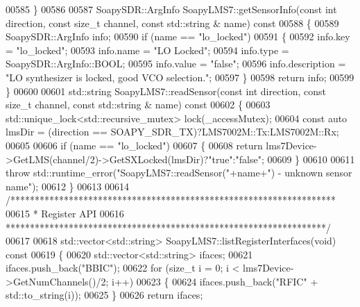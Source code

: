 \begin{DoxyCode}
{{{{{{{{{{{{{{00585 \}
00586 
00587 SoapySDR::ArgInfo SoapyLMS7::getSensorInfo(\textcolor{keyword}{const} \textcolor{keywordtype}{int} direction, \textcolor{keyword}{const} \textcolor{keywordtype}{size\_t} channel, \textcolor{keyword}{const} std::string &
      name)\textcolor{keyword}{ const}
00588 \textcolor{keyword}{}\{
00589     SoapySDR::ArgInfo info;
00590     \textcolor{keywordflow}{if} (name == \textcolor{stringliteral}{"lo\_locked"})
00591     \{
00592         info.key = \textcolor{stringliteral}{"lo\_locked"};
00593         info.name = \textcolor{stringliteral}{"LO Locked"};
00594         info.type = SoapySDR::ArgInfo::BOOL;
00595         info.value = \textcolor{stringliteral}{"false"};
00596         info.description = \textcolor{stringliteral}{"LO synthesizer is locked, good VCO selection."};
00597     \}
00598     \textcolor{keywordflow}{return} info;
00599 \}
00600 
00601 std::string SoapyLMS7::readSensor(\textcolor{keyword}{const} \textcolor{keywordtype}{int} direction, \textcolor{keyword}{const} \textcolor{keywordtype}{size\_t} channel, \textcolor{keyword}{const} std::string &
      name)\textcolor{keyword}{ const}
00602 \textcolor{keyword}{}\{
00603     std::unique\_lock<std::recursive\_mutex> lock(_accessMutex);
00604     \textcolor{keyword}{const} \textcolor{keyword}{auto} lmsDir = (direction == SOAPY\_SDR\_TX)?LMS7002M::Tx:LMS7002M::Rx;
00605 
00606     \textcolor{keywordflow}{if} (name == \textcolor{stringliteral}{"lo\_locked"})
00607     \{
00608         \textcolor{keywordflow}{return} lms7Device->GetLMS(channel/2)->GetSXLocked(lmsDir)?\textcolor{stringliteral}{"true"}:\textcolor{stringliteral}{"false"};
00609     \}
00610 
00611     \textcolor{keywordflow}{throw} std::runtime\_error(\textcolor{stringliteral}{"SoapyLMS7::readSensor("}+name+\textcolor{stringliteral}{") - unknown sensor name"});
00612 \}
00613 
00614 \textcolor{comment}{/*******************************************************************}
00615 \textcolor{comment}{ * Register API}
00616 \textcolor{comment}{ ******************************************************************/}
00617 
00618 std::vector<std::string> SoapyLMS7::listRegisterInterfaces(\textcolor{keywordtype}{void})\textcolor{keyword}{ const}
00619 \textcolor{keyword}{}\{
00620     std::vector<std::string> ifaces;
00621     ifaces.push\_back(\textcolor{stringliteral}{"BBIC"});
00622     \textcolor{keywordflow}{for} (\textcolor{keywordtype}{size\_t} i = 0; i < lms7Device->GetNumChannels()/2; i++)
00623     \{
00624         ifaces.push\_back(\textcolor{stringliteral}{"RFIC"} + std::to\_string(i));
00625     \}
00626     \textcolor{keywordflow}{return} ifaces;
}}}}}}}}}}}}}}
\end{DoxyCode}
